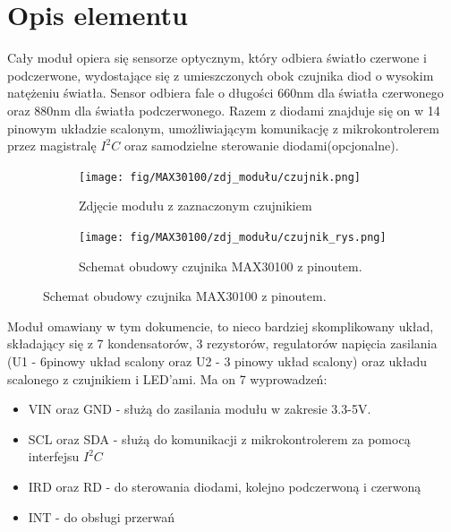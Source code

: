 \documentclass[11pt, a4paper]{article}
\author{Anna Nasierowska}
\begin{document}
%
%
\newpage

\section*{Opis elementu}
Cały moduł opiera się sensorze optycznym, który odbiera światło czerwone i podczerwone, wydostające się z umieszczonych obok czujnika diod o wysokim natężeniu światła. Sensor odbiera fale o długości 660nm dla światła czerwonego oraz 880nm dla światła podczerwonego. Razem z diodami znajduje się on w 14 pinowym układzie scalonym, umożliwiającym komunikację z mikrokontrolerem przez magistralę $I^2C$ oraz samodzielne sterowanie diodami(opcjonalne). 

\vspace{0.25cm}
\begin{figure}[h]
\centering
\begin{subfigure}{.5\textwidth}
\centering
\texttt{[image: fig/MAX30100/zdj\_modułu/czujnik.png]}
\caption{Zdjęcie modułu z zaznaczonym czujnikiem}
\label{fig:_zdjecie_elementu}
\end{subfigure}%
\begin{subfigure}{.5\textwidth}
\centering
\texttt{[image: fig/MAX30100/zdj\_modułu/czujnik\_rys.png]}
\caption{Schemat obudowy czujnika MAX30100 z pinoutem.}
\label{fig:_zasada_dzialania_elementu}
\end{subfigure}
\label{fig:element}
\end{figure}
\vspace{0.25cm}



\vspace{0.75cm}

Moduł omawiany w tym dokumencie, to nieco bardziej skomplikowany układ, składający się z 7 kondensatorów, 3 rezystorów, regulatorów napięcia zasilania (U1 - 6pinowy układ scalony oraz U2 - 3 pinowy układ scalony) oraz układu scalonego z czujnikiem i LED'ami. Ma on 7 wyprowadzeń: 
\begin{itemize}
    \item VIN oraz GND - służą do zasilania modułu w zakresie 3.3-5V. 
    \item SCL oraz SDA - służą do komunikacji z mikrokontrolerem za pomocą interfejsu $I^2C$
    \item IRD oraz RD  - do sterowania diodami, kolejno podczerwoną i czerwoną
    \item INT - do obsługi przerwań 
\end{itemize}
\end{document}
